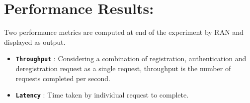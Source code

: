 \documentclass[hidelinks]{report}
\newcommand{\cf}[1] {
	\textbf{\texttt{#1}}
}
\begin{document}
\section*{Performance Results:}
Two performance metrics are computed at end of the experiment by RAN and displayed as output.
\begin{itemize}
\item \cf{Throughput}: Considering a combination of registration, authentication and deregistration request as a single request, throughput is the number of requests completed per second.
\item \cf{Latency}: Time taken by individual request to complete.
\end{itemize}
\end{document}
